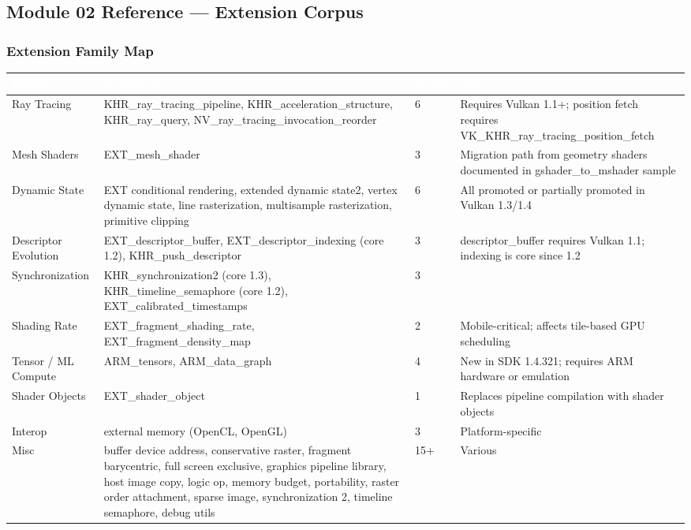 \documentclass[11pt,letterpaper]{article}
\newcommand{\tableheader}[1]{\textbf{\sffamily\textcolor{white}{#1}}}
\begin{document}
\subsection{Module 02 Reference --- Extension Corpus}

\subsubsection{Extension Family Map}

\begin{center}
\begin{tabularx}{\textwidth}{L{3.5cm}L{2.5cm}C{1.5cm}X}
\toprule
{}
\tableheader{Family} & \tableheader{Extensions} & \tableheader{Count} & \tableheader{Notes} \\
\midrule
Ray Tracing & KHR\_ray\_tracing\_pipeline, KHR\_acceleration\_structure, KHR\_ray\_query, NV\_ray\_tracing\_invocation\_reorder & 6 & Requires Vulkan 1.1+; position fetch requires VK\_KHR\_ray\_tracing\_position\_fetch \\
Mesh Shaders & EXT\_mesh\_shader & 3 & Migration path from geometry shaders documented in gshader\_to\_mshader sample \\
Dynamic State & EXT conditional rendering, extended dynamic state2, vertex dynamic state, line rasterization, multisample rasterization, primitive clipping & 6 & All promoted or partially promoted in Vulkan 1.3/1.4 \\
Descriptor Evolution & EXT\_descriptor\_buffer, EXT\_descriptor\_indexing (core 1.2), KHR\_push\_descriptor & 3 & descriptor\_buffer requires Vulkan 1.1; indexing is core since 1.2 \\
Synchronization & KHR\_synchronization2 (core 1.3), KHR\_timeline\_semaphore (core 1.2), EXT\_calibrated\_timestamps & 3 & \\
Shading Rate & EXT\_fragment\_shading\_rate, EXT\_fragment\_density\_map & 2 & Mobile-critical; affects tile-based GPU scheduling \\
Tensor / ML Compute & ARM\_tensors, ARM\_data\_graph & 4 & New in SDK 1.4.321; requires ARM hardware or emulation \\
Shader Objects & EXT\_shader\_object & 1 & Replaces pipeline compilation with shader objects \\
Interop & external memory (OpenCL, OpenGL) & 3 & Platform-specific \\
Misc & buffer device address, conservative raster, fragment barycentric, full screen exclusive, graphics pipeline library, host image copy, logic op, memory budget, portability, raster order attachment, sparse image, synchronization 2, timeline semaphore, debug utils & 15+ & Various \\
\bottomrule
\end{tabularx}
\end{center}
\end{document}

